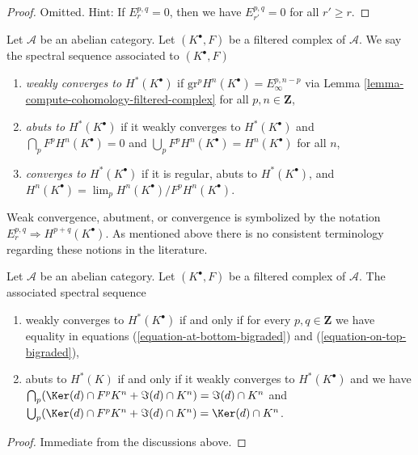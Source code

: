 \begin{proof}
Omitted. Hint: If $E_r^{p, q} = 0$, then we have $E_{r'}^{p, q} = 0$
for all $r' \geq r$.
\end{proof}

\begin{definition}
\label{definition-filtered-complex-ss-converges}
Let $\mathcal{A}$ be an abelian category. Let $(K^\bullet, F)$ be a
filtered complex of $\mathcal{A}$. We say the spectral sequence
associated to $(K^\bullet, F)$
\begin{enumerate}
\item {\it weakly converges to $H^*(K^\bullet)$} if
$\text{gr}^pH^n(K^\bullet) = E_{\infty}^{p, n - p}$
via Lemma \ref{lemma-compute-cohomology-filtered-complex}
for all $p, n \in \mathbf{Z}$,
\item {\it abuts to $H^*(K^\bullet)$} if it weakly converges to
$H^*(K^\bullet)$ and $\bigcap_p F^pH^n(K^\bullet) = 0$ and
$\bigcup_p F^p H^n(K^\bullet) = H^n(K^\bullet)$ for all $n$,
\item {\it converges to $H^*(K^\bullet)$} if it is regular,
abuts to $H^*(K^\bullet)$, and
$H^n(K^\bullet) = \lim_p H^n(K^\bullet)/F^pH^n(K^\bullet)$.
\end{enumerate}
\end{definition}

\noindent
Weak convergence, abutment, or convergence is symbolized by the notation
$E_r^{p, q} \Rightarrow H^{p + q}(K^\bullet)$.
As mentioned above there is no consistent terminology regarding
these notions in the literature.

\begin{lemma}
\label{lemma-filtered-complex-ss-converges}
Let $\mathcal{A}$ be an abelian category. Let $(K^\bullet, F)$ be a filtered
complex of $\mathcal{A}$. The associated spectral sequence
\begin{enumerate}
\item weakly converges to $H^*(K^\bullet)$ if and only if for every
$p, q \in \mathbf{Z}$ we have equality in equations
(\ref{equation-at-bottom-bigraded}) and (\ref{equation-on-top-bigraded}),
\item abuts to $H^*(K)$ if and only if it weakly converges to $H^*(K^\bullet)$
and we have
$\bigcap_p (\Ker(d) \cap F^pK^n + \Im(d) \cap K^n) = \Im(d) \cap K^n$
and
$\bigcup_p (\Ker(d) \cap F^pK^n + \Im(d) \cap K^n) = \Ker(d) \cap K^n$.
\end{enumerate}
\end{lemma}

\begin{proof}
Immediate from the discussions above.
\end{proof}

